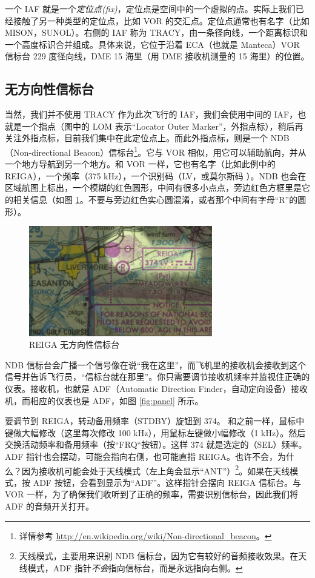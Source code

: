 一个 IAF 就是一个\emph{定位点(fix)}，定位点是空间中的一个虚拟的点。实际上我们已经接触了另一种类型的定位点，比如 VOR 的交汇点。定位点通常也有名字（比如 MISON，SUNOL）。右侧的 IAF 称为 TRACY，由一条径向线，一个距离标识和一个高度标识合并组成。具体来说，它位于沿着 ECA（也就是 Manteca）VOR 信标台 229 度径向线，DME 15 海里（用 DME 接收机测量的 15 海里）的位置。

\subsection{无方向性信标台}

当然，我们并不使用 TRACY 作为此次飞行的 IAF，我们会使用中间的 IAF，也就是一个指点（图中的 LOM 表示“Locator Outer Marker”，外指点标），稍后再关注外指点标，目前我们集中在此定位点上。而此外指点标，则是一个 NDB（Non-directional Beacon）信标台\footnote{详情参考 \url{http://en.wikipedia.org/wiki/Non-directional_beacon}。}。它与 VOR 相似，用它可以辅助航向，并从一个地方导航到另一个地方。和 VOR 一样，它也有名字（比如此例中的 REIGA），一个频率（375 kHz），一个识别码（LV，或莫尔斯码 {\mdot\mdash\mdot\mdot\mspace \mdot\mdot\mdot\mdash}）。NDB 也会在区域航图上标出，一个模糊的红色圆形，中间有很多小点点，旁边红色方框里是它的相关信息（如图 \ref{fig:NDB}。不要与旁边红色实心圆混淆，或者那个中间有字母“R”的圆形）。

\begin{figure}
  \begin{center}
    \includegraphics[width=8cm]{img/NDB}
    \caption{REIGA 无方向性信标台}
    \label{fig:NDB}
  \end{center}
\end{figure}

NDB 信标台会广播一个信号像在说“我在这里”，而飞机里的接收机会接收到这个信号并告诉飞行员，“信标台就在那里”。你只需要调节接收机频率并监视住正确的仪表。接收机，也就是 ADF（Automatic Direction Finder，自动定向设备）接收机，而相应的仪表也是 ADF，如图 \ref{fig:panel} 所示。

要调节到 REIGA，转动备用频率（STDBY）旋钮到 374。 和之前一样，鼠标中键做大幅修改（这里每次修改 100 kHz），用鼠标左键做小幅修改（1 kHz）。然后交换活动频率和备用频率（按“FRQ“按钮）。这样 374 就是选定的（SEL）频率。ADF 指针也会摆动，可能会指向右侧，也可能直指 REIGA。也许不会，为什么？因为接收机可能会处于天线模式（左上角会显示“ANT”）\footnote{天线模式，主要用来识别 NDB 信标台，因为它有较好的音频接收效果。在天线模式，ADF 指针\emph{不会}指向信标台，而是永远指向右侧。}。如果在天线模式，按 ADF 按钮，会看到显示为“ADF”。这样指针会摆向 REIGA 信标台。与 VOR 一样，为了确保我们收听到了正确的频率，需要识别信标台，因此我们将 ADF 的音频开关打开。


